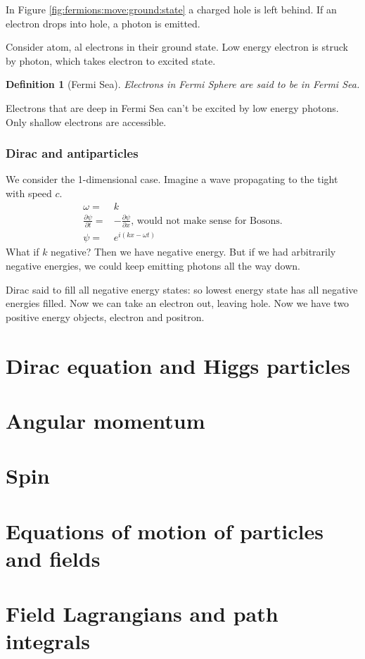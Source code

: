 \documentclass[]{article}
\newtheorem{defn}[thm]{Definition}
\begin{document}
In Figure \ref{fig:fermions:move:ground:state} a charged hole is left behind.
If an electron drops into hole, a photon is emitted.

Consider atom, al electrons in their ground state. Low energy electron is struck by photon, which takes electron to excited state.

\begin{defn}[Fermi Sea]
	Electrons in Fermi Sphere are said to be in Fermi Sea.
\end{defn}

Electrons that are deep in Fermi Sea can't be excited by low energy photons. Only shallow electrons are accessible.

\subsubsection{Dirac and antiparticles}

We consider the 1-dimensional case. Imagine a wave propagating to the tight with speed $c$.
\begin{align*}
\omega =& k\\
\frac{\partial \psi}{\partial t} =& - \frac{\partial \psi}{\partial x} \text{, would not make sense for Bosons.}\\
\psi =& e^{i(kx-\omega t)}
\end{align*}
What if $k$ negative? Then we have negative energy. But if we had arbitrarily negative energies, we could keep emitting photons all the way down.

Dirac said to fill all negative energy states: so lowest energy state has all negative energies filled. Now we can take an electron out, leaving hole. Now we have two positive energy objects, electron and positron.




\section{Dirac equation and Higgs particles}

\section{Angular momentum}

\section{Spin}

\section{Equations of motion of particles and fields}

\section{Field Lagrangians and path integrals}
\end{document}
